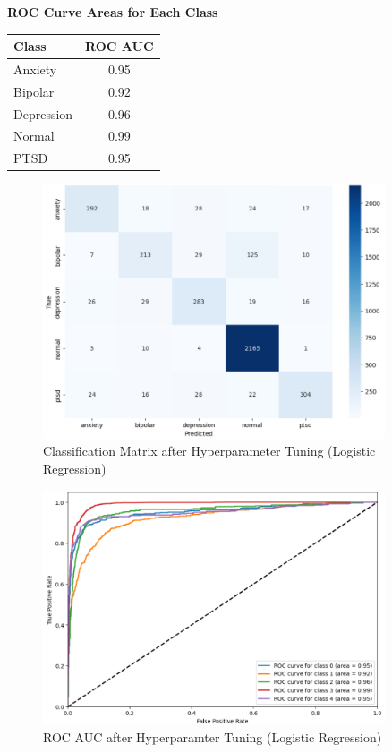 \begin{center}
    \textbf{ROC Curve Areas for Each Class} \\[0.5em]
    \begin{tabular}{|l|c|}
        \hline
        \textbf{Class}  & \textbf{ROC AUC} \\ \hline
        Anxiety         & 0.95            \\ \hline
        Bipolar         & 0.92            \\ \hline
        Depression      & 0.96            \\ \hline
        Normal          & 0.99            \\ \hline
        PTSD            & 0.95            \\ \hline
    \end{tabular}
\end{center}

\begin{figure}[h!]  
    \centering
    \includegraphics[width=0.9\textwidth]{Images/HP LR CM.png}  
    \caption{Classification Matrix after Hyperparameter Tuning (Logistic Regression)}
    \label{LSTMROC2}  %
\end{figure}

\begin{figure}[h!]  
    \centering
    \includegraphics[width=0.9\textwidth]{Images/HP LR ROC.png}  
    \caption{ROC AUC after Hyperparamter Tuning (Logistic Regression)}
    \label{LSTMROC3}  %
\end{figure}

